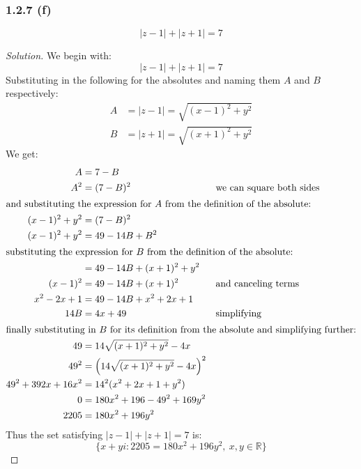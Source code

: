 \documentclass{article}
\newenvironment{solution}{
\begin{proof}[Solution]}{
\end{proof}}
\begin{document}
\subsubsection*{1.2.7 (f)}
\[
  |z-1| + |z+1| = 7
\]
\begin{solution}
  We begin with:
  \[
    |z-1| + |z+1| = 7
  \]
  Substituting in the following for the absolutes and naming them $A$ and $B$ respectively:
  \begin{align*}
    A &= |z-1| = \sqrt{(x-1)^2 + y^2} \\
    B &= |z+1| = \sqrt{(x+1)^2 + y^2}
  \end{align*}
  We get:
  \begin{align*}
    A &= 7 - B \\
    A^2 &= (7-B)^2 && \text{we can square both sides} \\
    \intertext{and substituting the expression for $A$ from the definition of the absolute:}
    (x-1)^2 + y^2 &= (7-B)^2 \\
    (x-1)^2 + y^2 &= 49 - 14B + B^2 \\
    \intertext{substituting the expression for $B$ from the definition of the absolute:}
      &= 49 - 14B + (x+1)^2 + y^2 \\
    (x-1)^2 &= 49 - 14B + (x+1)^2 && \text{and canceling terms} \\
    x^2 - 2x + 1 &= 49 - 14B + x^2 + 2x + 1 \\
    14B &= 4x + 49 && \text{simplifying} \\
    \intertext{finally substituting in $B$ for its definition from the absolute and simplifying further:}
    49 &= 14\sqrt{(x+1)^2 + y^2} - 4x \\
    49^2 &= \left(14\sqrt{(x+1)^2 + y^2} - 4x\right)^2 \\
    49^2 + 392x + 16x^2 &= 14^2(x^2 + 2x + 1 + y^2) \\
    0 &= 180x^2 + 196 - 49^2 + 169y^2 \\
    2205 &= 180x^2 + 196y^2
  \end{align*}
  Thus the set satisfying $|z-1| + |z+1| = 7$ is:
  \[
    \{x + yi : 2205 = 180x^2 + 196y^2,\ x, y \in \mathbb{R}\}
  \]
\end{solution}
\end{document}
